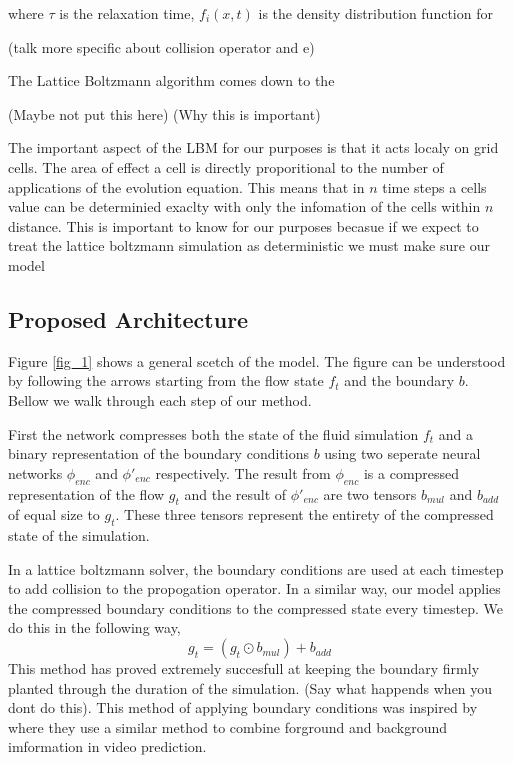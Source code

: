 \documentclass{article}
\begin{document}
where $\tau$ is the relaxation time, $f_i(x,t)$ is the density distribution function for

(talk more specific about collision operator and e)

The Lattice Boltzmann algorithm comes down to the 

(Maybe not put this here)
(Why this is important)

The important aspect of the LBM for our purposes is that it acts localy on grid cells. The area of effect a cell is directly proporitional to the number of applications of the evolution equation. This means that in $n$ time steps a cells value can be determinied exaclty with only the infomation of the cells within $n$ distance. This is important to know for our purposes becasue if we expect to treat the lattice boltzmann simulation as deterministic we must make sure our model 

\subsection{Proposed Architecture}

Figure \ref{fig_1} shows a general scetch of the model. The figure can be understood by following the arrows starting from the flow state $f_t$ and the boundary $b$. Bellow we walk through each step of our method.

First the network compresses both the state of the fluid simulation $f_t$ and a binary representation of the boundary conditions $b$ using two seperate neural networks $\phi_{enc}$ and $\phi'_{enc}$ respectively. The result from $\phi_{enc}$ is a compressed representation of the flow $g_t$ and the result of $\phi'_{enc}$ are two tensors $b_{mul}$ and $b_{add}$ of equal size to $g_t$. These three tensors represent the entirety of the compressed state of the simulation.

In a lattice boltzmann solver, the boundary conditions are used at each timestep to add collision to the propogation operator. In a similar way, our model applies the compressed boundary conditions to the compressed state every timestep. We do this in the following way,
\begin{equation}
  g_t = (g_t \odot b_{mul}) + b_{add}
\end{equation}
This method has proved extremely succesfull at keeping the boundary firmly planted through the duration of the simulation. (Say what happends when you dont do this). This method of applying boundary conditions was inspired by\cite{vondrick2016generating} where they use a similar method to combine forground and background imformation in video prediction.
\end{document}
